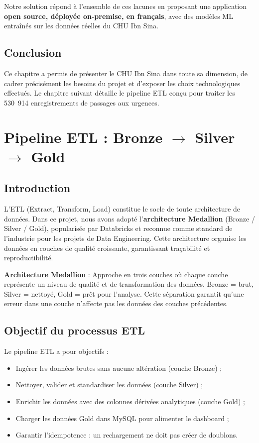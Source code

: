 \documentclass[12pt,a4paper]{report}
\begin{document}
	Notre solution répond à l'ensemble de ces lacunes en proposant une application
	\textbf{open source, déployée on-premise, en français}, avec des modèles ML entraînés
	sur les données réelles du CHU Ibn Sina.
	
	\section{Conclusion}
	
	Ce chapitre a permis de présenter le CHU Ibn Sina dans toute sa dimension, de cadrer
	précisément les besoins du projet et d'exposer les choix technologiques effectués.
	Le chapitre suivant détaille le pipeline ETL conçu pour traiter les 530~914 enregistrements
	de passages aux urgences.
	
	\chapter{Pipeline ETL : Bronze $\rightarrow$ Silver $\rightarrow$ Gold}
	
	\section{Introduction}
	
	L'ETL (Extract, Transform, Load) constitue le socle de toute architecture de données.
	Dans ce projet, nous avons adopté l'\textbf{architecture Medallion} (Bronze / Silver / Gold),
	popularisée par Databricks et reconnue comme standard de l'industrie pour les projets de
	Data Engineering. Cette architecture organise les données en couches de qualité croissante,
	garantissant traçabilité et reproductibilité.
	
	\begin{infobox}
		\textbf{Architecture Medallion} : Approche en trois couches où chaque couche représente
		un niveau de qualité et de transformation des données. Bronze = brut, Silver = nettoyé,
		Gold = prêt pour l'analyse. Cette séparation garantit qu'une erreur dans une couche
		n'affecte pas les données des couches précédentes.
	\end{infobox}
	
	\section{Objectif du processus ETL}
	
	Le pipeline ETL a pour objectifs :
	\begin{itemize}
		\item Ingérer les données brutes sans aucune altération (couche Bronze) ;
		\item Nettoyer, valider et standardiser les données (couche Silver) ;
		\item Enrichir les données avec des colonnes dérivées analytiques (couche Gold) ;
		\item Charger les données Gold dans MySQL pour alimenter le dashboard ;
		\item Garantir l'idempotence : un rechargement ne doit pas créer de doublons.
	\end{itemize}
	
\end{document}
